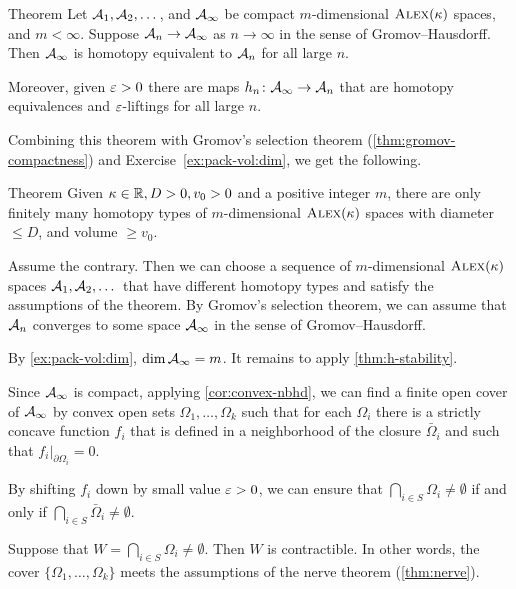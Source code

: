 \begin{thm}{Theorem}\label{thm:h-stability}
Let $\mathcal{A}_1,\mathcal{A}_2,\dots$, and $\mathcal{A}_\infty$ be compact $m$-dimensional $\textup{\textsc{Alex}}(\kappa)$ spaces, and $m<\infty$.
Suppose $\spc{A}_n\z\to \spc{A}_\infty$ as $n\to \infty$ in the sense of Gromov--Hausdorff.
Then $\mathcal{A}_\infty$ is homotopy equivalent to $\mathcal{A}_n$ for all large $n$.

Moreover, given $\varepsilon>0$ there are maps $h_n\colon\mathcal{A}_\infty\to \mathcal{A}_n$ that are homotopy equivalences and $\varepsilon$-liftings for all large $n$.
\end{thm}

Combining this theorem with Gromov's selection theorem (\ref{thm:gromov-compactness}) and Exercise~\ref{ex:pack-vol:dim}, we get the following.

\begin{thm}{Theorem}\label{thm:h-finiteness}
Given $\kappa\in \mathbb{R}, D>0, v_0>0$ and a positive integer $m$,
there are only finitely many homotopy types of $m$-dimensional $\textup{\textsc{Alex}}(\kappa)$ spaces with diameter $\le D$, and volume $\ge v_0$.
\end{thm}

Assume the contrary.
Then we can choose a sequence of $m$-dimensional $\textup{\textsc{Alex}}(\kappa)$ spaces $\mathcal{A}_1,\mathcal{A}_2,\dots$ that have different homotopy types and satisfy the assumptions of the theorem.
By Gromov's selection theorem, we can assume that $\mathcal{A}_n$ converges to some space $\mathcal{A}_\infty$ in the sense of Gromov--Hausdorff.

By \ref{ex:pack-vol:dim}, $\operatorname{\rm dim}\nolimits \mathcal{A}_\infty=m$.
It remains to apply \ref{thm:h-stability}.
\qeds

Since $\mathcal{A}_\infty$ is compact, applying \ref{cor:convex-nbhd}, we can find a finite open cover of $\mathcal{A}_\infty$ by convex open sets $\Omega_1,\dots, \Omega_k$ such that
for each $\Omega_i$ there is a strictly concave function $f_i$ that is defined in a neighborhood of the closure $\bar \Omega_i$ and such that $f_i|_{\partial \Omega_i}=0$.

By shifting $f_i$ down by small value $\varepsilon>0$,
we can ensure that $\bigcap_{i\in S}\Omega_{i}\ne \emptyset$ if and only if $\bigcap_{i\in S}\bar\Omega_{i}\ne \emptyset$.

Suppose that $W=\bigcap_{i\in S}\Omega_{i}\ne \emptyset$.
Then $W$ is contractible.
In other words, the cover $\{\Omega_1,\dots, \Omega_k\}$ meets the assumptions of the nerve theorem (\ref{thm:nerve}).

